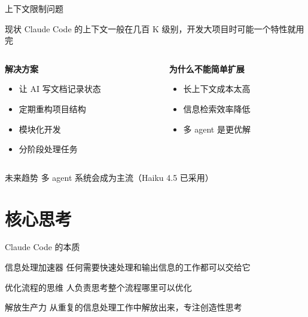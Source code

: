 \documentclass[aspectratio=169,xcolor=dvipsnames]{beamer}
\begin{document}
\begin{frame}{上下文限制问题}
  \begin{block}{现状}
    Claude Code 的上下文一般在几百 K 级别，开发大项目时可能一个特性就用完
  \end{block}

  \vspace{0.3cm}

  \begin{columns}
    \begin{column}{0.48\textwidth}
      \textbf{解决方案}
      \begin{itemize}
        \item 让 AI 写文档记录状态
        \item 定期重构项目结构
        \item 模块化开发
        \item 分阶段处理任务
      \end{itemize}
    \end{column}
    \begin{column}{0.48\textwidth}
      \textbf{为什么不能简单扩展}
      \begin{itemize}
        \item 长上下文成本太高
        \item 信息检索效率降低
        \item 多 agent 是更优解
      \end{itemize}
    \end{column}
  \end{columns}

  \vspace{0.3cm}

  \begin{alertblock}{未来趋势}
    多 agent 系统会成为主流（Haiku 4.5 已采用）
  \end{alertblock}
\end{frame}

\section{核心思考}

\begin{frame}{Claude Code 的本质}
  \begin{block}{信息处理加速器}
    任何需要快速处理和输出信息的工作都可以交给它
  \end{block}

  \vspace{0.3cm}

  \begin{exampleblock}{优化流程的思维}
    人负责思考整个流程哪里可以优化
  \end{exampleblock}

  \vspace{0.3cm}

  \begin{alertblock}{解放生产力}
    从重复的信息处理工作中解放出来，专注创造性思考
  \end{alertblock}
\end{frame}
\end{document}
